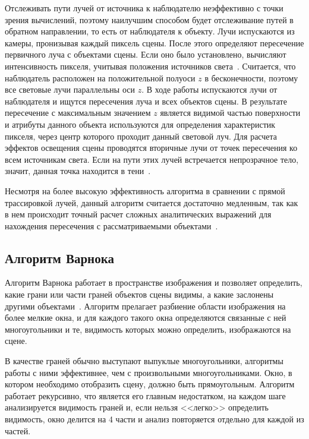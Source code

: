 \documentclass[a4paper, 14pt]{extreport}
\begin{document}
Отслеживать пути лучей от источника к наблюдателю неэффективно с точки зрения вычислений, поэтому наилучшим способом 
будет отслеживание путей в обратном направлении, то есть от наблюдателя к объекту. Лучи испускаются из камеры, 
пронизывая каждый пиксель сцены. После этого определяют пересечение первичного луча с объектами сцены. 
Если оно было установлено, вычисляют интенсивность пикселя, учитывая положения источников света~\cite{eromin}.
Считается, что наблюдатель расположен на положительной полуоси $z$ в бесконечности, поэтому все световые лучи 
параллельны оси $z$. В ходе работы испускаются лучи от наблюдателя и ищутся пересечения луча и всех объектов сцены. 
В результате пересечение с максимальным значением $z$ является видимой частью поверхности и атрибуты данного объекта 
используются для определения характеристик пикселя, через центр которого проходит данный световой луч.
Для расчета эффектов освещения сцены проводятся вторичные лучи от точек пересечения ко всем источникам света. Если на 
пути этих лучей встречается непрозрачное тело, значит, данная точка находится в тени~\cite{rodjers}.

Несмотря на более высокую эффективность алгоритма в сравнении с прямой трассировкой лучей, данный алгоритм считается 
достаточно медленным, так как в нем происходит точный расчет сложных аналитических выражений для нахождения 
пересечения с рассматриваемыми объектами~\cite{eromin}.

\subsection{Алгоритм Варнока}

Алгоритм Варнока работает в пространстве изображения и позволяет определить, какие грани или части граней объектов сцены 
видимы, а какие заслонены другими объектами~\cite{porev}. Алгоритм прелагает разбиение области изображения на более 
мелкие окна, и для каждого такого окна определяются связанные с ней многоугольники и те, видимость которых можно 
определить, изображаются на сцене.

В качестве граней обычно выступают выпуклые многоугольники, алгоритмы работы с ними эффективнее, чем с произвольными 
многоугольниками. Окно, в котором необходимо отобразить сцену, должно быть прямоугольным. Алгоритм работает 
рекурсивно, что является его главным недостатком, на каждом шаге анализируется видимость граней и, если  нельзя <<легко>> 
определить видимость, окно делится на 4 части и анализ повторяется отдельно для каждой из частей. 
\end{document}
